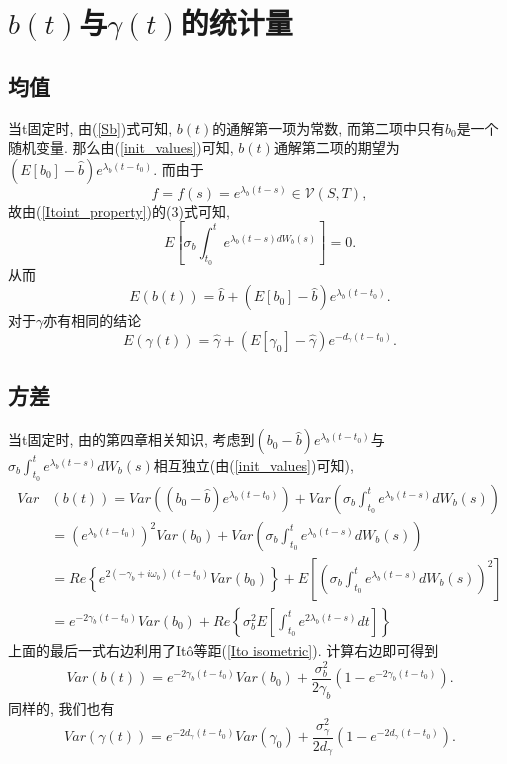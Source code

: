 \documentclass[notitlepage,cs4size,punct,oneside]{ctexrep}
\numberwithin{equation}{section}
\theoremstyle{mystyle}
\begin{document}
\section{$b(t)$与$\gamma(t)$的统计量}
\subsection{均值}
当t固定时, 由(\ref{Sb})式可知, $b(t)$的通解第一项为常数, 而第二项中只有$b_0$是一个随机变量. 那么由(\ref{init_values})可知, $b(t)$通解第二项的期望为$(E[b_0]-\hat{b})e^{\lambda_b(t-t_0)}$. 而由于
$$f = f(s) = e^{\lambda_b(t-s)}\in\mathcal{V}(S, T),$$
故由(\ref{Itoint_property})的(3)式可知,
$$E\left[\sigma_b\int_{t_0}^{t} e^{\lambda_b(t-s)dW_b(s)}\right] = 0.$$
从而
\begin{equation} \label{b_stat_1}
E(b(t)) = \hat{b} + (E[b_0] - \hat{b})e^{\lambda_b(t-t_0)}.
\end{equation}
对于$\gamma$亦有相同的结论
\begin{equation} \label{gamma_stat_1}
E(\gamma(t)) = \hat{\gamma} + (E[\gamma_0] - \hat{\gamma})e^{-d_{\gamma}(t-t_0)}.
\end{equation}

\subsection{方差}
当t固定时, 由\cite{shuyuanhe2006probability}的第四章相关知识, 考虑到$(b_0-\hat{b})e^{\lambda_b(t-t_0)}$与$\sigma_b\int_{t_0}^t e^{\lambda_b(t-s)}dW_b(s)$相互独立(由(\ref{init_values})可知),
\begin{equation} \label{b_stat_2_process}
\begin{split}
Var&(b(t)) = Var\left((b_0 - \hat{b})e^{\lambda_b(t-t_0)}\right) + Var\left(\sigma_b\int_{t_0}^{t}e^{\lambda_b(t-s)}dW_b(s)\right) \\
&= (e^{\lambda_b(t-t_0)})^2Var(b_0) + Var\left(\sigma_b\int_{t_0}^t e^{\lambda_b(t-s)}dW_b(s)\right) \\
&= Re\left\{e^{2(-\gamma_b+i\omega_b)(t-t_0)}Var(b_0)\right\} + E\left[\left(\sigma_b\int_{t_0}^t e^{\lambda_b(t-s)}dW_b(s)\right)^2\right] \\
&= e^{-2\gamma_b(t-t_0)}Var(b_0) + Re\left\{\sigma_b^2E\left[\int_{t_0}^t e^{2\lambda_b (t-s)}dt\right]\right\}
\end{split}
\end{equation}
上面的最后一式右边利用了It\^{o}等距(\ref{Ito isometric}).
计算右边即可得到
\begin{equation} \label{b_stat_2} 
Var(b(t)) = e^{-2\gamma_b(t-t_0)}Var(b_0) + \frac{\sigma_b^2}{2\gamma_b}(1-e^{-2\gamma_b(t-t_0)}).
\end{equation}
同样的, 我们也有
\begin{equation} \label{gamma_stat_2}
Var(\gamma(t)) = e^{-2d_\gamma(t-t_0)}Var(\gamma_0) + \frac{\sigma_\gamma^2}{2d_\gamma}(1-e^{-2d_\gamma(t-t_0)}).
\end{equation}
\end{document}
